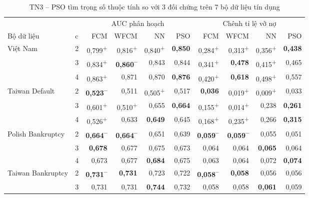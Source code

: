 \begin{table}[htbp]
\centering
\caption{TN3 -- PSO tìm trọng số thuộc tính so với 3 đối chứng trên 7 bộ dữ liệu tín dụng}
\label{tab:e8-ket-qua}
\footnotesize
\setlength{\tabcolsep}{3pt}
\begin{tabular}{@{}llrrrrrrrr@{}}
\toprule
& & \multicolumn{4}{c}{AUC phân hoạch} & \multicolumn{4}{c}{Chênh tỉ lệ vỡ nợ} \\
\cmidrule(lr){3-6} \cmidrule(lr){7-10}
Bộ dữ liệu & c & FCM & WFCM & NN & PSO & FCM & WFCM & NN & PSO \\
\midrule
Việt Nam & 2 & 0,799\textsuperscript{+} & 0,816\textsuperscript{+} & 0,840\textsuperscript{+} & \textbf{0,850} & 0,284\textsuperscript{+} & 0,313\textsuperscript{+} & 0,356\textsuperscript{+} & \textbf{0,438} \\
 & 3 & 0,834\textsuperscript{+} & \textbf{0,860\textsuperscript{--}} & 0,843 & 0,844 & 0,341\textsuperscript{+} & \textbf{0,478} & 0,415\textsuperscript{+} & 0,465 \\
 & 4 & 0,863\textsuperscript{+} & 0,871 & 0,870 & \textbf{0,876} & 0,420\textsuperscript{+} & \textbf{0,618} & 0,498\textsuperscript{+} & 0,557 \\
\midrule
Taiwan Default & 2 & \textbf{0,523\textsuperscript{--}} & 0,511 & 0,505\textsuperscript{+} & 0,517 & \textbf{0,036} & 0,019\textsuperscript{+} & 0,009\textsuperscript{+} & 0,033 \\
 & 3 & 0,601\textsuperscript{+} & 0,510\textsuperscript{+} & 0,655 & \textbf{0,664} & 0,155\textsuperscript{+} & 0,014\textsuperscript{+} & 0,238 & \textbf{0,261} \\
 & 4 & 0,526\textsuperscript{+} & 0,633 & \textbf{0,649} & 0,645 & 0,168\textsuperscript{+} & 0,235\textsuperscript{+} & 0,266 & \textbf{0,315} \\
\midrule
Polish Bankruptcy & 2 & \textbf{0,664\textsuperscript{--}} & \textbf{0,664\textsuperscript{--}} & 0,651 & 0,639 & \textbf{0,059\textsuperscript{--}} & \textbf{0,059\textsuperscript{--}} & 0,055 & 0,051 \\
 & 3 & \textbf{0,678} & 0,677 & 0,675 & 0,673 & 0,064 & 0,064 & \textbf{0,065} & 0,064 \\
 & 4 & 0,673 & 0,677 & \textbf{0,684} & 0,675 & 0,063 & 0,064 & 0,072 & \textbf{0,074} \\
\midrule
Taiwan Bankruptcy & 2 & \textbf{0,731\textsuperscript{--}} & \textbf{0,731} & 0,723 & 0,722 & \textbf{0,058\textsuperscript{--}} & \textbf{0,058} & 0,056 & 0,056 \\
 & 3 & 0,731 & 0,731 & \textbf{0,744} & 0,732 & 0,058 & 0,058 & \textbf{0,061} & 0,059 \\

\end{tabular}
\end{table}

